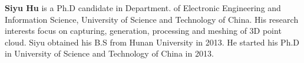 
\author{Siyu Hu         \and
        Xuejin Chen \and
        Xin Tong
}



\date{Received: date / Accepted: date}









%

%
%
\noindent \textbf{Siyu Hu} is a Ph.D candidate in Department. of Electronic Engineering and Information Science,
University of Science and Technology of China. His research interests focus on capturing, generation, processing and meshing of 3D point cloud. Siyu obtained his B.S from Hunan University in 2013. He started his Ph.D in University of Science and Technology of China in 2013.\\

